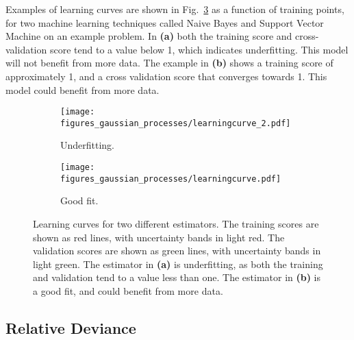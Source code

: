 \documentclass[twoside,english]{uiofysmaster}
\begin{document}
Examples of learning curves are shown in Fig.~\ref{Fig:: gaussian process : learning curves} as a function of training points, for two machine learning techniques called Naive Bayes and Support Vector Machine on an example problem. In \textbf{(a)} both the training score and cross-validation score tend to a value below 1, which indicates underfitting. This model will not benefit from more data. The example in \textbf{(b)} shows a training score of approximately 1, and a cross validation score that converges towards 1. This model could benefit from more data.

\begin{figure}
    \centering
    \begin{subfigure}[b]{0.45\textwidth}
        \texttt{[image: figures\_gaussian\_processes/learningcurve\_2.pdf]}
        \caption{Underfitting.}
        \label{fig:gull}
    \end{subfigure}
    \begin{subfigure}[b]{0.45\textwidth}
        \texttt{[image: figures\_gaussian\_processes/learningcurve.pdf]}
        \caption{Good fit.}
        \label{fig:tiger}
    \end{subfigure}
\caption{Learning curves for two different estimators. The training scores are shown as red lines, with uncertainty bands in light red. The validation scores are shown as green lines, with uncertainty bands in light green. The estimator in \textbf{(a)} is underfitting, as both the training and validation tend to a value less than one. The estimator in \textbf{(b)} is a good fit, and could benefit from more data.}
\label{Fig:: gaussian process : learning curves}
\end{figure}



\subsection{Relative Deviance}\label{Sec:: gaussian process : Relative Deviance}
\end{document}
